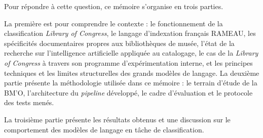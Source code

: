 Pour répondre à cette question, ce mémoire s'organise en trois parties. 


La première est pour comprendre le contexte : le fonctionnement de la classification \textit{Library of Congress}, le langage d'indexation français RAMEAU, les spécificités documentaires propres aux bibliothèques de musée, l'état de la recherche sur l'intelligence artificielle appliquée au catalogage, le cas de la \textit{Library of Congress} à travers son programme d'expérimentation interne, et les principes techniques et les limites structurelles des grands modèles de langage. 
La deuxième partie présente la méthodologie utilisée dans ce mémoire : le terrain d'étude de la BM'O, l'architecture du \textit{pipeline} développé, le cadre d'évaluation et le protocole des tests menés.

La troisième partie présente les résultats obtenus et une  discussion sur le comportement des modèles de langage en tâche de classification.


